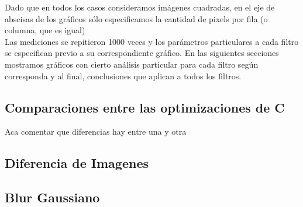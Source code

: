 \indent Dado que en todos los casos consideramos im\'agenes cuadradas, en el eje de abscisas de los gr\'aficos s\'olo especificamos la cantidad de pixels por fila (o columna, que es igual)\\
\indent Las mediciones se repitieron 1000 veces y los par\'ametros particulares a cada filtro se especifican previo a su correspondiente gr\'afico. 
En las siguientes secciones mostramos gr\'aficos con cierto an\'alisis particular para cada filtro seg\'un corresponda y al final, conclusiones que aplican a todos los filtros.

\subsection{Comparaciones entre las optimizaciones de C}

Aca comentar que diferencias hay entre una y otra 
   
\subsection{Diferencia de Imagenes}
  
\subsection{Blur Gaussiano}
  

  
  \newpage
  
